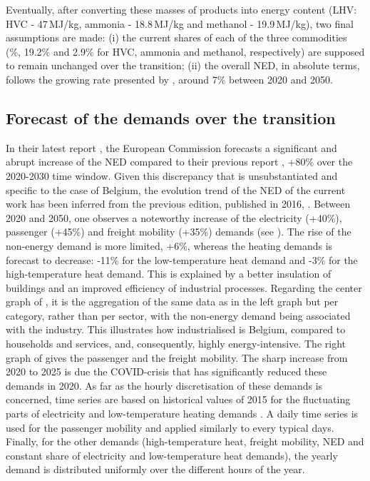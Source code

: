 Eventually, after converting these masses of products into energy content (\ie LHV: \gls{HVC} - 47\,MJ/kg, ammonia - 18.8\,MJ/kg and methanol - 19.9\,MJ/kg), two final assumptions are made: (i) the current shares of each of the three commodities (\%, 19.2\% and 2.9\% for \gls{HVC}, ammonia and methanol, respectively) are supposed to remain unchanged over the transition; (ii) the overall \gls{NED}, in absolute terms, follows the growing rate presented by \citet{EuropeanCommission2016}, \ie around 7\% between 2020 and 2050.

\subsection{Forecast of the demands over the transition}
\label{subsec:cs:EUD_forecast}
In their latest report \cite{EuropeanCommission2021}, the European Commission forecasts a significant and abrupt increase of the \gls{NED} compared to their previous report \cite{EuropeanCommission2016}, \ie +80\% over the 2020-2030 time window. Given this discrepancy that is unsubstantiated and specific to the case of Belgium, the evolution trend of the \gls{NED} of the current work has been inferred from the previous edition, published in 2016, \cite{EuropeanCommission2016}. Between 2020 and 2050, one observes a noteworthy increase of the electricity (+40\%), passenger (+45\%) and freight mobility (+35\%) demands (see ). The rise of the non-energy demand is more limited, \ie +6\%, whereas the heating demands is forecast to decrease: -11\% for the low-temperature heat demand and -3\% for the high-temperature heat demand. This is explained by a better insulation of buildings and an improved efficiency of industrial processes. Regarding the center graph of , it is the aggregation of the same data as in the left graph but per category, rather than per sector, with the non-energy demand being associated with the industry. This illustrates how industrialised is Belgium, compared to households and services, and, consequently, highly energy-intensive. The right graph of  gives the passenger and the freight mobility. The sharp increase from 2020 to 2025 is due the COVID-crisis that has significantly reduced these demands in 2020. As far as the hourly discretisation of these demands is concerned, time series are based on historical values of 2015 for the fluctuating parts of electricity and low-temperature heating demands \cite{Limpens2020}. A daily time series is used for the passenger mobility and applied similarly to every typical days. Finally, for the other demands (\ie high-temperature heat, freight mobility, \gls{NED} and constant share of electricity and low-temperature heat demands), the yearly demand is distributed uniformly over the different hours of the year.

